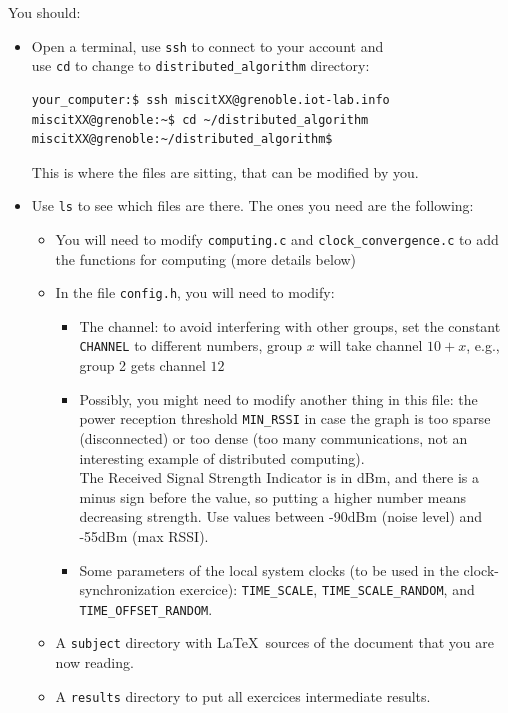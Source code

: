 \documentclass{article}
\begin{document}
You should:
\begin{itemize}
\item Open a terminal, use \verb=ssh= to connect to your account and \\
    use \verb=cd= to change to \verb=distributed_algorithm= directory:
    \begin{verbatim}your_computer:$ ssh miscitXX@grenoble.iot-lab.info
miscitXX@grenoble:~$ cd ~/distributed_algorithm
miscitXX@grenoble:~/distributed_algorithm$
\end{verbatim}
This is where the files are sitting, that can be modified by you.

\item Use \verb=ls= to see which files are there. The ones you need are the following:
	\begin{itemize}
	\item You will need to modify \verb=computing.c= and \verb=clock_convergence.c= to add the functions for computing (more details below)
	\item In the file \verb=config.h=, you will need to modify:
		\begin{itemize}

		\item The channel: to avoid interfering with other groups, set the
            constant \verb=CHANNEL= to different numbers, group $x$ will take
            channel $10+x$, e.g., group 2 gets channel $12$
		\item Possibly, you might  need to modify another thing in this file:
            the power reception threshold \verb=MIN_RSSI= in case the graph is
            too sparse (disconnected) or too dense (too many communications, not
            an interesting example of distributed computing).\\
            The Received Signal Strength Indicator is in dBm, and there is a minus sign before the value,
            so putting a higher number means decreasing strength.
            Use values between -90dBm (noise level) and -55dBm (max RSSI).
         \item Some parameters of the local system clocks (to be used in the clock-synchronization exercice): \verb=TIME_SCALE=, \verb=TIME_SCALE_RANDOM=, and \verb=TIME_OFFSET_RANDOM=.
		\end{itemize}
    \item A \verb=subject= directory with \LaTeX~sources of the document that you are now reading.
    \item A \verb=results= directory to put all exercices intermediate results.
	\end{itemize}
\end{itemize}
\end{document}
